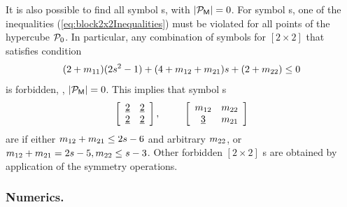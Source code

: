 \documentclass[12pt]{iopart}
\begin{document}
It is also possible to find all {\inadmissible} symbol {\brick s}, with
$|\mathcal{P}_{\mathsf{M}}|=0$. For {\inadmissible} symbol {\brick s}, one of the
inequalities (\ref{eq:block2x2Inequalities}) must be violated for all
points of the hypercube $\mathcal{P}_0$. In particular, any combination of
symbols for $[2\!\times\!2]$ {\brick} that satisfies condition
\[
(2+{m_{11}})(2s^2-1)+(4+{m_{12}}+{m_{21}})s+ (2+{m_{22}})\leq 0
\]
is forbidden, \ie, $|\mathcal{P}_{\mathsf{M}}|=0$. This implies that symbol {\brick s}
  \[
  \left[\begin{array}{cc}
        \underline{2} & \underline{2}  \\
        \underline{2} &  \underline{2}
              \end{array}\right],  \hspace*{25pt}
        \left[\begin{array}{cc}
        {\ensuremath{m_{12}}} & {m_{22}}  \\
        \underline{3} &  {m_{21}}
              \end{array}\right]
\]
are  {\inadmissible} if either ${m_{12}}+{m_{21}}\leq2s-6$ and
arbitrary  ${m_{22}}$, or
${m_{12}}+{m_{21}}=2s-5,{m_{22}}\leq s-3$.
Other forbidden $[2\times2]$ {\brick}s  are obtained by
application of the symmetry operations.

\subsubsection{Numerics.}
\label{sect:2Dnumerics}
\end{document}
